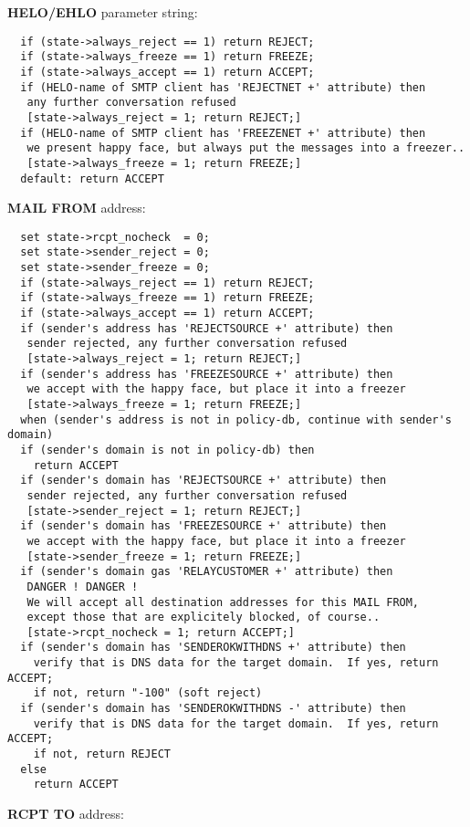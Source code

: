 {\bf HELO/EHLO} parameter string:

\begin{verbatim}
  if (state->always_reject == 1) return REJECT;
  if (state->always_freeze == 1) return FREEZE;
  if (state->always_accept == 1) return ACCEPT;
  if (HELO-name of SMTP client has 'REJECTNET +' attribute) then
   any further conversation refused
   [state->always_reject = 1; return REJECT;]
  if (HELO-name of SMTP client has 'FREEZENET +' attribute) then
   we present happy face, but always put the messages into a freezer..
   [state->always_freeze = 1; return FREEZE;]
  default: return ACCEPT
\end{verbatim}


{\bf MAIL FROM} address:

\begin{verbatim}
  set state->rcpt_nocheck  = 0;
  set state->sender_reject = 0;
  set state->sender_freeze = 0;
  if (state->always_reject == 1) return REJECT;
  if (state->always_freeze == 1) return FREEZE;
  if (state->always_accept == 1) return ACCEPT;
  if (sender's address has 'REJECTSOURCE +' attribute) then
   sender rejected, any further conversation refused
   [state->always_reject = 1; return REJECT;]
  if (sender's address has 'FREEZESOURCE +' attribute) then
   we accept with the happy face, but place it into a freezer
   [state->always_freeze = 1; return FREEZE;]
  when (sender's address is not in policy-db, continue with sender's domain)
  if (sender's domain is not in policy-db) then
    return ACCEPT
  if (sender's domain has 'REJECTSOURCE +' attribute) then
   sender rejected, any further conversation refused
   [state->sender_reject = 1; return REJECT;]
  if (sender's domain has 'FREEZESOURCE +' attribute) then
   we accept with the happy face, but place it into a freezer
   [state->sender_freeze = 1; return FREEZE;]
  if (sender's domain gas 'RELAYCUSTOMER +' attribute) then
   DANGER ! DANGER !
   We will accept all destination addresses for this MAIL FROM,
   except those that are explicitely blocked, of course..
   [state->rcpt_nocheck = 1; return ACCEPT;]
  if (sender's domain has 'SENDEROKWITHDNS +' attribute) then
    verify that is DNS data for the target domain.  If yes, return ACCEPT;
    if not, return "-100" (soft reject)
  if (sender's domain has 'SENDEROKWITHDNS -' attribute) then
    verify that is DNS data for the target domain.  If yes, return ACCEPT;
    if not, return REJECT
  else
    return ACCEPT
\end{verbatim}


{\bf RCPT TO} address:


